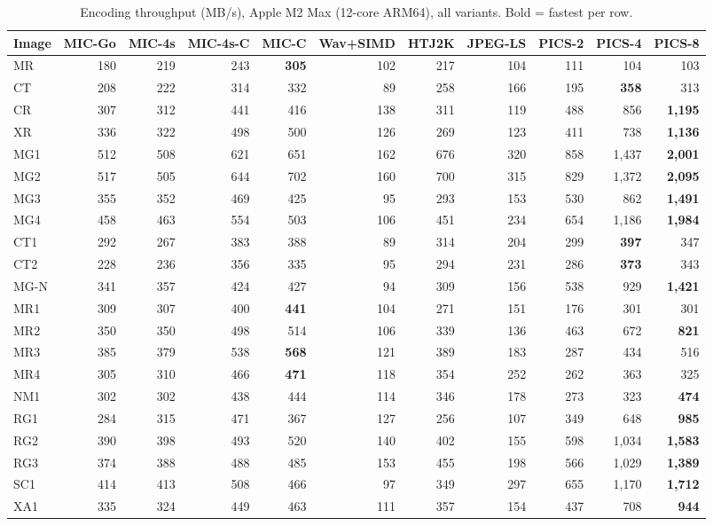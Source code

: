 \documentclass[journal]{IEEEtran}
\begin{document}
\begin{table}[htbp]
\centering
\caption{Encoding throughput (MB/s), Apple M2 Max (12-core ARM64), all
variants. Bold = fastest per row.}
\label{tab:enc-arm64-full}
\scriptsize
\begin{tabular}{lrrrrrrrrrr}
\toprule
Image & MIC-Go & MIC-4s & MIC-4s-C & MIC-C & Wav+SIMD & HTJ2K & JPEG-LS & PICS-2 & PICS-4 & PICS-8 \\
\midrule
MR  & 180 & 219 & 243 & \textbf{305} & 102 & 217 & 104 & 111 & 104 & 103 \\
CT  & 208 & 222 & 314 & 332 & 89 & 258 & 166 & 195 & \textbf{358} & 313 \\
CR  & 307 & 312 & 441 & 416 & 138 & 311 & 119 & 488 & 856 & \textbf{1,195} \\
XR  & 336 & 322 & 498 & 500 & 126 & 269 & 123 & 411 & 738 & \textbf{1,136} \\
MG1 & 512 & 508 & 621 & 651 & 162 & 676 & 320 & 858 & 1,437 & \textbf{2,001} \\
MG2 & 517 & 505 & 644 & 702 & 160 & 700 & 315 & 829 & 1,372 & \textbf{2,095} \\
MG3 & 355 & 352 & 469 & 425 & 95 & 293 & 153 & 530 & 862 & \textbf{1,491} \\
MG4 & 458 & 463 & 554 & 503 & 106 & 451 & 234 & 654 & 1,186 & \textbf{1,984} \\
CT1 & 292 & 267 & 383 & 388 & 89 & 314 & 204 & 299 & \textbf{397} & 347 \\
CT2 & 228 & 236 & 356 & 335 & 95 & 294 & 231 & 286 & \textbf{373} & 343 \\
MG-N & 341 & 357 & 424 & 427 & 94 & 309 & 156 & 538 & 929 & \textbf{1,421} \\
MR1 & 309 & 307 & 400 & \textbf{441} & 104 & 271 & 151 & 176 & 301 & 301 \\
MR2 & 350 & 350 & 498 & 514 & 106 & 339 & 136 & 463 & 672 & \textbf{821} \\
MR3 & 385 & 379 & 538 & \textbf{568} & 121 & 389 & 183 & 287 & 434 & 516 \\
MR4 & 305 & 310 & 466 & \textbf{471} & 118 & 354 & 252 & 262 & 363 & 325 \\
NM1 & 302 & 302 & 438 & 444 & 114 & 346 & 178 & 273 & 323 & \textbf{474} \\
RG1 & 284 & 315 & 471 & 367 & 127 & 256 & 107 & 349 & 648 & \textbf{985} \\
RG2 & 390 & 398 & 493 & 520 & 140 & 402 & 155 & 598 & 1,034 & \textbf{1,583} \\
RG3 & 374 & 388 & 488 & 485 & 153 & 455 & 198 & 566 & 1,029 & \textbf{1,389} \\
SC1 & 414 & 413 & 508 & 466 & 97 & 349 & 297 & 655 & 1,170 & \textbf{1,712} \\
XA1 & 335 & 324 & 449 & 463 & 111 & 357 & 154 & 437 & 708 & \textbf{944} \\
\bottomrule
\end{tabular}
\end{table}
\end{document}
